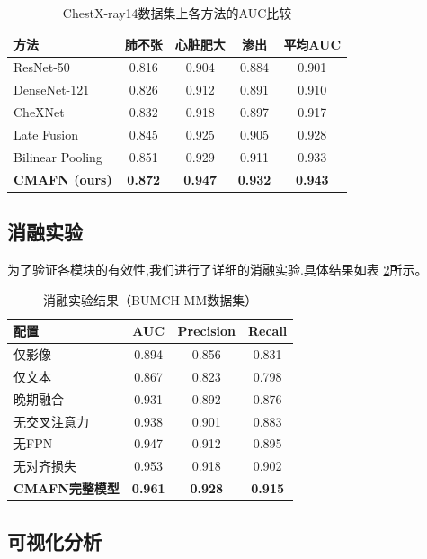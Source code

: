 \documentclass[12pt,a4paper]{article}
\theoremstyle{definition}
\begin{document}
\begin{table}[H]
\centering
\caption{ChestX-ray14数据集上各方法的AUC比较}\label{tab:main-results}
\begin{tabular}{@{}lcccc@{}}
\toprule
方法 & 肺不张 & 心脏肥大 & 渗出 & 平均AUC \\
\midrule
ResNet-50 \cite{he2016deep}  & 0.816 & 0.904 & 0.884 & 0.901 \\
DenseNet-121 \cite{huang2017densely} & 0.826 & 0.912 & 0.891 & 0.910 \\
CheXNet \cite{rajpurkar2017chexnet} & 0.832 & 0.918 & 0.897 & 0.917 \\
Late Fusion & 0.845 & 0.925 & 0.905 & 0.928 \\
Bilinear Pooling & 0.851 & 0.929 & 0.911 & 0.933 \\
\textbf{CMAFN (ours)} & \textbf{0.872} & \textbf{0.947} & \textbf{0.932} & \textbf{0.943} \\
\bottomrule
\end{tabular}
\end{table}

\subsection{消融实验}

为了验证各模块的有效性,我们进行了详细的消融实验.具体结果如表
\ref{tab:ablation}所示。

\begin{table}[H]
\centering
\caption{消融实验结果（BUMCH-MM数据集）}\label{tab:ablation}
\begin{tabular}{@{}lccc@{}}
\toprule
配置 & AUC & Precision & Recall \\
\midrule
仅影像 & 0.894 & 0.856 & 0.831 \\
仅文本 & 0.867 & 0.823 & 0.798 \\
晚期融合 & 0.931 & 0.892 & 0.876 \\
无交叉注意力 & 0.938 & 0.901 & 0.883 \\
无FPN & 0.947 & 0.912 & 0.895 \\
无对齐损失 & 0.953 & 0.918 & 0.902 \\
\textbf{CMAFN完整模型} & \textbf{0.961} & \textbf{0.928} & \textbf{0.915} \\
\bottomrule
\end{tabular}
\end{table}

\subsection{可视化分析}
\end{document}
